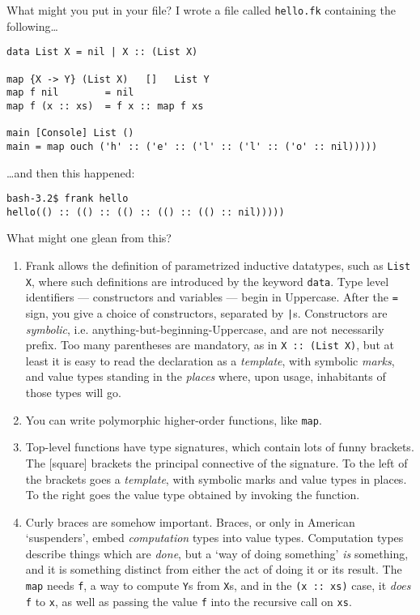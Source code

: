 \documentclass{article}
\begin{document}
What might you put in your file? I wrote a file called \texttt{hello.fk} containing the following\ldots
\begin{verbatim}
data List X = nil | X :: (List X)

map {X -> Y} (List X)   []   List Y
map f nil        = nil
map f (x :: xs)  = f x :: map f xs

main [Console] List ()
main = map ouch ('h' :: ('e' :: ('l' :: ('l' :: ('o' :: nil)))))
\end{verbatim}
\ldots and then this happened:
\begin{verbatim}
bash-3.2$ frank hello
hello(() :: (() :: (() :: (() :: (() :: nil)))))
\end{verbatim}
What might one glean from this?
\begin{enumerate}
\item Frank allows the definition of parametrized inductive datatypes, such as \texttt{List X}, where such definitions are introduced by the keyword \texttt{data}. Type level identifiers --- constructors and variables --- begin in Uppercase. After the \texttt{=} sign, you give a choice of constructors, separated by \texttt{|}s. Constructors are \emph{symbolic}, i.e. anything-but-beginning-Uppercase, and are not necessarily prefix.
Too many parentheses are mandatory, as in \texttt{X :: (List X)}, but at
least it is easy to read the declaration as a \emph{template}, with symbolic \emph{marks}, and value types standing in the \emph{places} where, upon usage, inhabitants of those types will go.
\item You can write polymorphic higher-order functions, like \texttt{map}.
\item Top-level functions have type signatures, which contain lots of funny brackets. The [square] brackets the principal connective
of the signature. To the left of the brackets goes a \emph{template}, with symbolic marks and value types in places. To the right goes the value
type obtained by invoking the function.
\item Curly braces are somehow important. Braces, or only in American
`suspenders', embed \emph{computation} types into value types. Computation types describe things which are \emph{done}, but a `way of doing something' \emph{is} something, and it is something distinct from either the act of doing it or its result. The \texttt{map} needs \texttt{f}, a way to compute \texttt{Y}s from \texttt{X}s, and in the \texttt{(x :: xs)} case, it \emph{does} \texttt{f} to \texttt{x}, as well as passing the value \texttt{f} into the recursive call on \texttt{xs}.

\end{enumerate}
\end{document}

